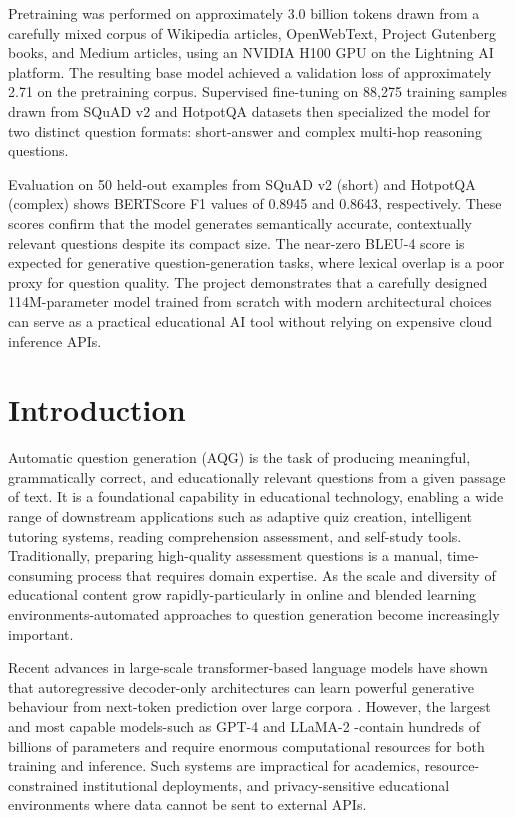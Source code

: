 \documentclass[12pt]{article}
\begin{document}
Pretraining was performed on approximately 3.0 billion tokens drawn from a carefully mixed corpus of Wikipedia articles, OpenWebText, Project Gutenberg books, and Medium articles, using an NVIDIA H100 GPU on the Lightning AI platform. The resulting base model achieved a validation loss of approximately 2.71 on the pretraining corpus. Supervised fine-tuning on 88,275 training samples drawn from SQuAD v2 and HotpotQA datasets then specialized the model for two distinct question formats: short-answer and complex multi-hop reasoning questions.

Evaluation on 50 held-out examples from SQuAD v2 (short) and HotpotQA (complex) shows BERTScore F1 values of 0.8945 and 0.8643, respectively. These scores confirm that the model generates semantically accurate, contextually relevant questions despite its compact size. The near-zero BLEU-4 score is expected for generative question-generation tasks, where lexical overlap is a poor proxy for question quality. The project demonstrates that a carefully designed 114M-parameter model trained from scratch with modern architectural choices can serve as a practical educational AI tool without relying on expensive cloud inference APIs.

\newpage
{}

\section{Introduction}

Automatic question generation (AQG) is the task of producing meaningful, grammatically correct, and educationally relevant questions from a given passage of text. It is a foundational capability in educational technology, enabling a wide range of downstream applications such as adaptive quiz creation, intelligent tutoring systems, reading comprehension assessment, and self-study tools. Traditionally, preparing high-quality assessment questions is a manual, time-consuming process that requires domain expertise. As the scale and diversity of educational content grow rapidly-particularly in online and blended learning environments-automated approaches to question generation become increasingly important.

Recent advances in large-scale transformer-based language models have shown that autoregressive decoder-only architectures can learn powerful generative behaviour from next-token prediction over large corpora \citep{radford2019language, vaswani2017attention}. However, the largest and most capable models-such as GPT-4 and LLaMA-2 \citep{touvron2023llama}-contain hundreds of billions of parameters and require enormous computational resources for both training and inference. Such systems are impractical for academics, resource-constrained institutional deployments, and privacy-sensitive educational environments where data cannot be sent to external APIs.
\end{document}
